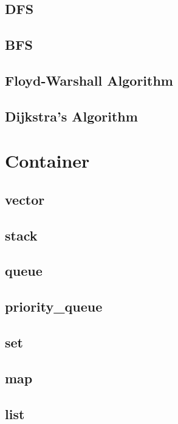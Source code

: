 \documentclass[a4paper, landscape, 8pt]{article}
\begin{document}
\begin{multicols*}{3}
\subsection{DFS}

\subsection{BFS}

\subsection{Floyd-Warshall Algorithm}

\subsection{Dijkstra's Algorithm}


\section{Container}
\subsection{vector}

\subsection{stack}

\subsection{queue}

\subsection{priority\_queue}

\subsection{set}

\subsection{map}

\subsection{list}



\end{multicols*}
\end{document}
